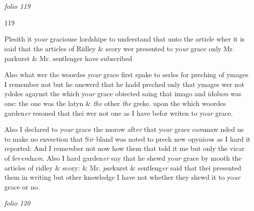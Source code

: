 \documentclass[12pt, a4paper]{book}
\begin{document}
\dotfill
						  \section*{}

\textit{folio 119}



\begin{flushright}{\color{Mahogany}119}\end{flushright}
            		
		\ifthenelse{\isodd{\thepage}}
		{\reversemarginpar}
		{\normalmarginpar}
		Plesith it yo\textit{ur} graciouse lordshipe to understand that unto the
            			article wher it is said that the articles of Ridley \& scory
            			wer presented to yo\textit{ur} grace only Mr. parkurst \& Mr. sentlenger
 have subscribed
            			
		\ifthenelse{\isodd{\thepage}}
		{\reversemarginpar}
		{\normalmarginpar}
		Also what wer the woordes yo\textit{ur} grace first spake to serles for
 preching of ymages I remember not but he answerd
 that he hadd preched only that ymages wer not ydoles
 agaynst the which yo\textit{ur} grace obiected saing that imago and
 idolu\textit{m} was one: the one was the latyn \& \textit{the} other \textit{the} greke.
            				upon the which woordes garden\textit{er} resoned that thei wer not
            				one as I have befor writen to yo\textit{ur} grace.
            			
		\ifthenelse{\isodd{\thepage}}
		{\reversemarginpar}
		{\normalmarginpar}
		Also I declared to yo\textit{ur} grace the morow aft\textit{er} that yo\textit{ur} grace co\textit{m}maw           				nded us to make no envection that S\textit{ir} bland was noted to
 prech new opynio\textit{n}s as I hard it reported: And I reme\textit{m}ber not
            				now how them that told it me but only the vicar of fev\textit{er}sha\textit{m}.
            				Also I hard garden\textit{er} say that he shewd yo\textit{ur} grace by mooth the
            				articles of ridley \& scory: \& Mr. \textit{par}kurst \& sentleng\textit{er} said that
 thei presented them in writing but other knowledge I have
 not whether they shewd it to yo\textit{ur} grace or no.


\dotfill
						\newpage
{}

\textit{folio 120}


         \vspace*{4cm}
         
\end{document}
